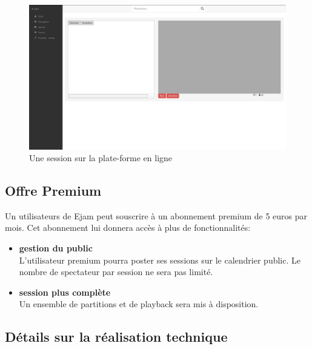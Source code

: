 \documentclass[a4,12pt]{article}
\begin{document}
\begin{figure}[!ht]
    \center
    \includegraphics[width=15cm]{ceca_site_session.png}
    \caption{Une session sur la plate-forme en ligne}
    \label{ceca_site_session}
\end{figure}

\subsection{Offre Premium}

Un utilisateurs de Ejam peut souscrire à un abonnement premium de 5 euros par mois. Cet abonnement lui donnera
accès à plus de fonctionnalités:
\begin{itemize}
    \item \textbf{gestion du public}\\
		L'utilisateur premium pourra poster ses sessions sur le calendrier public. Le nombre de spectateur par session ne sera pas limité.
    \item \textbf{session plus complète}\\
		Un ensemble de partitions et de playback sera mis à disposition.
\end{itemize}


\subsection{Détails sur la réalisation technique}
\end{document}
